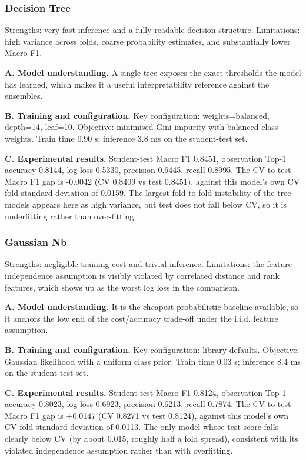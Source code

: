 \documentclass[11pt,a4paper]{article}
\begin{document}
\subsubsection{Decision Tree}

Strengths: very fast inference and a fully readable decision structure. Limitations: high variance across folds, coarse probability estimates, and substantially lower Macro F1.

\noindent\textbf{A. Model understanding.} A single tree exposes the exact thresholds the model has learned, which makes it a useful interpretability reference against the ensembles.

\noindent\textbf{B. Training and configuration.} Key configuration: weights=balanced, depth=14, leaf=10. Objective: minimised Gini impurity with balanced class weights. Train time 0.90 s; inference 3.8 ms on the student-test set.

\noindent\textbf{C. Experimental results.} Student-test Macro F1 0.8451, observation Top-1 accuracy 0.8144, log loss 0.5330, precision 0.6445, recall 0.8995. The CV-to-test Macro F1 gap is -0.0042 (CV 0.8409 vs test 0.8451), against this model's own CV fold standard deviation of 0.0159. The largest fold-to-fold instability of the tree models appears here as high variance, but test does not fall below CV, so it is underfitting rather than over-fitting.

\subsubsection{Gaussian Nb}

Strengths: negligible training cost and trivial inference. Limitations: the feature-independence assumption is visibly violated by correlated distance and rank features, which shows up as the worst log loss in the comparison.

\noindent\textbf{A. Model understanding.} It is the cheapest probabilistic baseline available, so it anchors the low end of the cost/accuracy trade-off under the i.i.d. feature assumption.

\noindent\textbf{B. Training and configuration.} Key configuration: library defaults. Objective: Gaussian likelihood with a uniform class prior. Train time 0.03 s; inference 8.4 ms on the student-test set.

\noindent\textbf{C. Experimental results.} Student-test Macro F1 0.8124, observation Top-1 accuracy 0.8023, log loss 0.6923, precision 0.6213, recall 0.7874. The CV-to-test Macro F1 gap is +0.0147 (CV 0.8271 vs test 0.8124), against this model's own CV fold standard deviation of 0.0113. The only model whose test score falls clearly below CV (by about 0.015, roughly half a fold spread), consistent with its violated independence assumption rather than with overfitting.
\end{document}
